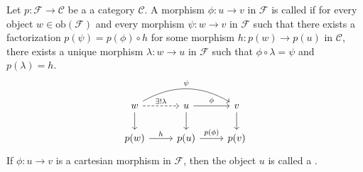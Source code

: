\begin{definition} \label{definition:cartesian_morphism_in_a_category_over_a_category_and_pullback}
Let $p: \mathcal{F} \to \mathcal{C}$ be a  a category $\mathcal{C}$.
A morphism $\phi: u \to v$ in $\mathcal{F}$ is called  if for every object $w \in \text{ob}(\mathcal{F})$ and every morphism $\psi: w \to v$ in $\mathcal{F}$ such that there exists a factorization $p(\psi) = p(\phi) \circ h$ for some morphism $h: p(w) \to p(u)$ in $\mathcal{C}$, there exists a unique morphism $\lambda: w \to u$ in $\mathcal{F}$ such that $\phi \circ \lambda = \psi$ and $p(\lambda) = h$.
$$
\begin{tikzcd}
w \arrow[rr, "\psi", bend left] \arrow[d] \arrow[r, dashed, "\exists ! \lambda"] & u \arrow[r, "\phi"] \arrow[d] & v \arrow[d] \\
p(w) \arrow[r, "h"] & p(u) \arrow[r, "p(\phi)"] & p(v)
\end{tikzcd}
$$
If $\phi: u \to v$ is a cartesian morphism in $\mathcal{F}$, then the object $u$ is called a .
\end{definition}